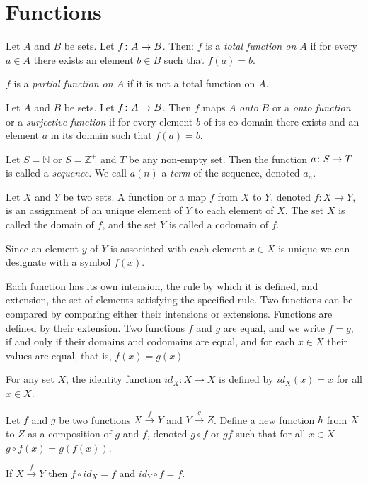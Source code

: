 \documentclass[letterpaper, 10pt]{article}
\begin{document}
\section{Functions}
	Let $A$ and $B$ be sets. Let $f \colon A \to B$. Then:
	$f$ is a \emph{total function on $A$} if for every $a \in A$ there exists an
	element $b \in B$ such that $f(a) = b$.

	$f$ is a \emph{partial function on $A$} if it is not a total function on
	$A$.

	Let $A$ and $B$ be sets. Let $f \colon A \to B$. Then $f$ maps $A$ \emph{onto}
	$B$ or a \emph{onto function} or a \emph{surjective function} if for every
	element $b$ of its co-domain there exists and an element $a$ in its domain such
	that $f(a) = b$.

	Let $S = \mathbb{N}$ or $S = \mathbb{Z}^+$ and $T$ be any non-empty set.
	Then the function $a \colon S \to T$ is called a \emph{sequence}. We call $a(n)$ a
	\emph{term} of the sequence, denoted $a_n$.

	Let $X$ and $Y$ be two sets. A function or a map $f$ from $X$ to $Y$,
	denoted $f\colon X \to Y$, is an assignment of an unique element of $Y$ to
	each element of $X$. The set $X$ is called the domain of $f$, and the set
	$Y$ is called a codomain of $f$.
	
	Since an element $y$ of $Y$ is associated with each element $x \in X$ is unique
	we can designate with a symbol $f(x)$.

	Each function has its own intension, the rule by which it is defined, and
	extension, the set of elements satisfying the specified rule. Two functions
	can be compared by comparing either their intensions or extensions.
	Functions are defined by their extension. Two functions $f$ and $g$ are
	equal, and we write $f = g$, if and only if
	their domains and codomains are equal, and for each $x\in X$ their values
	are equal, that is, $f(x) = g(x)$.

	For any set $X$, the identity function $id_X\colon X \to X$ is defined by
	$id_X(x) = x$ for all $x\in X$. 

	Let $f$ and $g$ be two functions $X\stackrel{f}{\to}Y$ and
	$Y\stackrel{g}{\to}Z$. Define a new function $h$ from $X$ to $Z$ as a
	composition of $g$ and $f$, denoted $g\circ f$ or $gf$ such that for all
	$x\in X$ $g \circ f(x) = g(f(x))$.

	\begin{thm*}
		If $X\stackrel{f}{\to}Y$ then $f\circ id_X = f$ and $id_Y \circ f = f$.
	\end{thm*}
\end{document}
